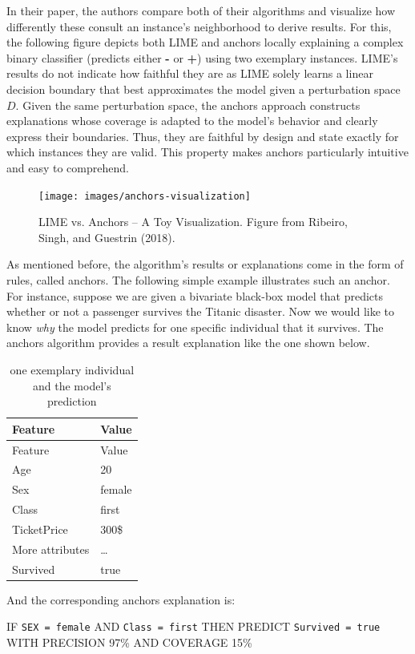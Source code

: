 \documentclass[
  12pt,
]{krantz}
\begin{document}
In their paper, the authors compare both of their algorithms and visualize how differently these consult an instance's neighborhood to derive results. For this, the following figure depicts both LIME and anchors locally explaining a complex binary classifier (predicts either \textbf{-} or \textbf{+}) using two exemplary instances. LIME's results do not indicate how faithful they are as LIME solely learns a linear decision boundary that best approximates the model given a perturbation space \(D\). Given the same perturbation space, the anchors approach constructs explanations whose coverage is adapted to the model's behavior and clearly express their boundaries. Thus, they are faithful by design and state exactly for which instances they are valid. This property makes anchors particularly intuitive and easy to comprehend.

\begin{figure}

{\centering \texttt{[image: images/anchors-visualization]} 

}

\caption{LIME vs. Anchors -- A Toy Visualization. Figure from Ribeiro, Singh, and Guestrin (2018).}\label{fig:unnamed-chunk-29}
\end{figure}

As mentioned before, the algorithm's results or explanations come in the form of rules, called anchors. The following simple example illustrates such an anchor. For instance, suppose we are given a bivariate black-box model that predicts whether or not a passenger survives the Titanic disaster. Now we would like to know \emph{why} the model predicts for one specific individual that it survives. The anchors algorithm provides a result explanation like the one shown below.

\begin{longtable}[]{@{}ll@{}}
\caption{one exemplary individual and the model's prediction}\tabularnewline
\toprule
Feature & Value\tabularnewline
\midrule
\endfirsthead
\toprule
Feature & Value\tabularnewline
\midrule
\endhead
Age & 20\tabularnewline
Sex & female\tabularnewline
Class & first\tabularnewline
TicketPrice & 300\$\tabularnewline
More attributes & \ldots{}\tabularnewline
Survived & true\tabularnewline
\bottomrule
\end{longtable}

And the corresponding anchors explanation is:

IF \texttt{SEX\ =\ female} AND \texttt{Class\ =\ first} THEN PREDICT \texttt{Survived\ =\ true} WITH PRECISION 97\% AND COVERAGE 15\%
\end{document}
